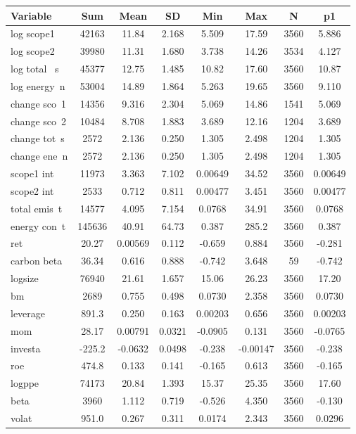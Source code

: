 \documentclass[]{article}
\begin{document}
\begin{tabular}{lccccccc} \hline
Variable & Sum & Mean & SD & Min & Max & N & p1 \\ \hline
log scope1 & 42163 & 11.84 & 2.168 & 5.509 & 17.59 & 3560 & 5.886 \\
log scope2 & 39980 & 11.31 & 1.680 & 3.738 & 14.26 & 3534 & 4.127 \\
log total ~s & 45377 & 12.75 & 1.485 & 10.82 & 17.60 & 3560 & 10.87 \\
log energy~n & 53004 & 14.89 & 1.864 & 5.263 & 19.65 & 3560 & 9.110 \\
change sco~1 & 14356 & 9.316 & 2.304 & 5.069 & 14.86 & 1541 & 5.069 \\
change sco~2 & 10484 & 8.708 & 1.883 & 3.689 & 12.16 & 1204 & 3.689 \\
change tot~s & 2572 & 2.136 & 0.250 & 1.305 & 2.498 & 1204 & 1.305 \\
change ene~n & 2572 & 2.136 & 0.250 & 1.305 & 2.498 & 1204 & 1.305 \\
scope1 int & 11973 & 3.363 & 7.102 & 0.00649 & 34.52 & 3560 & 0.00649 \\
scope2 int & 2533 & 0.712 & 0.811 & 0.00477 & 3.451 & 3560 & 0.00477 \\
total emis~t & 14577 & 4.095 & 7.154 & 0.0768 & 34.91 & 3560 & 0.0768 \\
energy con~t & 145636 & 40.91 & 64.73 & 0.387 & 285.2 & 3560 & 0.387 \\
ret & 20.27 & 0.00569 & 0.112 & -0.659 & 0.884 & 3560 & -0.281 \\
carbon beta & 36.34 & 0.616 & 0.888 & -0.742 & 3.648 & 59 & -0.742 \\
logsize & 76940 & 21.61 & 1.657 & 15.06 & 26.23 & 3560 & 17.20 \\
bm & 2689 & 0.755 & 0.498 & 0.0730 & 2.358 & 3560 & 0.0730 \\
leverage & 891.3 & 0.250 & 0.163 & 0.00203 & 0.656 & 3560 & 0.00203 \\
mom & 28.17 & 0.00791 & 0.0321 & -0.0905 & 0.131 & 3560 & -0.0765 \\
investa & -225.2 & -0.0632 & 0.0498 & -0.238 & -0.00147 & 3560 & -0.238 \\
roe & 474.8 & 0.133 & 0.141 & -0.165 & 0.613 & 3560 & -0.165 \\
logppe & 74173 & 20.84 & 1.393 & 15.37 & 25.35 & 3560 & 17.60 \\
beta & 3960 & 1.112 & 0.719 & -0.526 & 4.350 & 3560 & -0.130 \\
volat & 951.0 & 0.267 & 0.311 & 0.0174 & 2.343 & 3560 & 0.0296 \\

\end{tabular}
\end{document}

